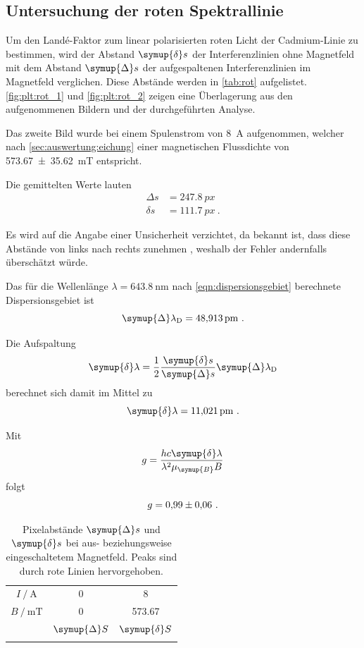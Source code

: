 \subsection{Untersuchung der roten Spektrallinie}
Um den Landé-Faktor zum linear polarisierten roten Licht der Cadmium-Linie zu bestimmen,
wird der Abstand $\symup{\delta} s$ der Interferenzlinien ohne Magnetfeld
mit dem Abstand $\symup{\Delta} s$ der aufgespaltenen Interferenzlinien im Magnetfeld verglichen.
Diese Abstände werden in \autoref{tab:rot} aufgelistet.
\autoref{fig:plt:rot_1} und \autoref{fig:plt:rot_2} zeigen eine Überlagerung
aus den aufgenommenen Bildern und der durchgeführten Analyse.

Das zweite Bild wurde bei einem Spulenstrom von \SI{8}{\ampere} aufgenommen,
welcher nach \autoref{sec:auswertung:eichung} einer magnetischen Flussdichte von \SI{573.67 \pm 35.62}{\milli\tesla} entspricht.

Die gemittelten Werte lauten
\begin{align*}
    Δs &= \SI{247.8}{px} \\
    δs &= \SI{111.7}{px} \ .
\end{align*}

Es wird auf die Angabe einer Unsicherheit verzichtet,
da bekannt ist, dass diese Abstände von links nach rechts zunehmen \cite{versuchsanleitung},
weshalb der Fehler andernfalls überschätzt würde.


Das für die Wellenlänge $\lambda = \SI{643.8}{\nano\meter}$ nach \autoref{eqn:dispersionsgebiet} berechnete Dispersionsgebiet ist
\[
    \symup{\Delta}\lambda_\text{D} = \SI{48.913}{\pico\meter} \ .
\]

Die Aufspaltung
\begin{equation}
    \label{eqn:delta_lambda}
    \symup{\delta} \lambda = \frac{1}{2} \frac{\symup{\delta} s}{\symup{\Delta} s} \symup{\Delta} \lambda_\text{D}
\end{equation}
berechnet sich damit im Mittel zu
\[
    \symup{\delta} \lambda = \SI{11.021}{\pico\meter} \ .
\]

Mit
\begin{equation}
    \label{eqn:g_mess}
    g = \frac{hc \symup{\delta} \lambda}{\lambda^2 \mu_{\symup{B}} B}
\end{equation}
folgt
\[
    g = \num{0.99 \pm 0.06} \ .
\]


\begin{table}[H]
    \centering
    \caption{
        Pixelabstände $\symup{\Delta} s$ und $\symup{\delta} s$ bei aus- beziehungsweise eingeschaltetem Magnetfeld.
        Peaks sind durch rote Linien hervorgehoben.
    }
    \label{tab:rot}
    \begin{tabular}{S S S}
        \toprule
        {$I \mathbin{/} \si{\ampere}$} & 0 & 8 \\
        {$B \mathbin{/} \si{\milli\tesla}$} & 0 & 573.67  \\
        \midrule
        & {$\symup{\Delta} S$} & {$\symup{\delta} S$} \\
        \midrule
        \bottomrule
    \end{tabular}
\end{table}

